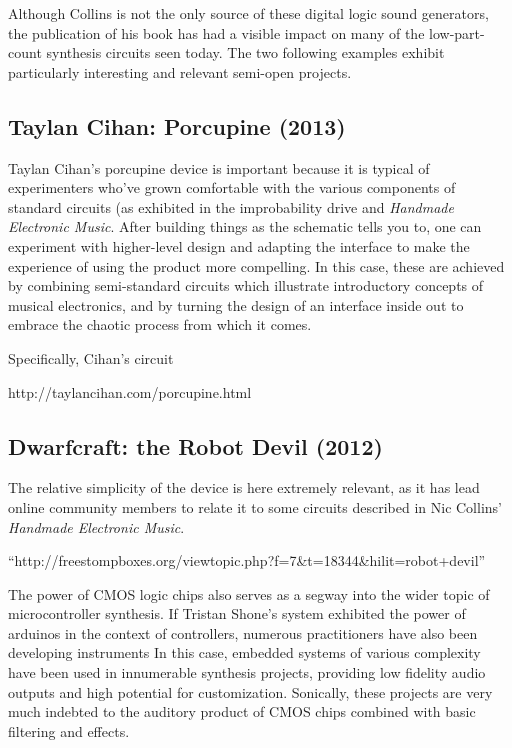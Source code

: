 Although Collins is not the only source of these digital logic sound generators, the publication of his book has had a visible impact on many of the low-part-count synthesis circuits seen today. The two following examples exhibit particularly interesting and relevant semi-open projects. 

\subsection{Taylan Cihan: Porcupine (2013)}

Taylan Cihan's porcupine device is important because it is typical of experimenters who've grown comfortable with the various components of standard circuits (as exhibited in the improbability drive and \emph{Handmade Electronic Music}. After building things as the schematic tells you to, one can experiment with higher-level design and adapting the interface to make the experience of using the product more compelling. In this case, these are achieved by combining semi-standard circuits which illustrate introductory concepts of musical electronics, and by turning the design of an interface inside out to embrace the chaotic process from which it comes. 

Specifically, Cihan's circuit 

http://taylancihan.com/porcupine.html

\subsection{Dwarfcraft: the Robot Devil (2012)}

The relative simplicity of the device is here extremely relevant, as it has lead online community members to relate it to some circuits described in Nic Collins' \emph{Handmade Electronic Music}. 

``http://freestompboxes.org/viewtopic.php?f=7&t=18344&hilit=robot+devil''

The power of CMOS logic chips also serves as a segway into the wider topic of microcontroller synthesis. If Tristan Shone's system exhibited the power of arduinos in the context of controllers, numerous practitioners have also been developing instruments  In this case, embedded systems of various complexity have been used in innumerable synthesis projects, providing low fidelity audio outputs and high potential for customization. Sonically, these projects are very much indebted to the auditory product of CMOS chips combined with basic filtering and effects. 

